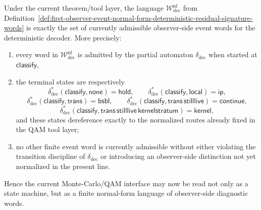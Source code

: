 \begin{proposition}
\label{prop:observer-event-normal-forms-exactly-currently-admissible-decoder-words}
Under the current theorem/tool layer, the language \(\mathcal W^{\mathrm{nf}}_{\mathrm{dec}}\) from Definition~\ref{def:first-observer-event-normal-form-deterministic-residual-signature-words} is exactly the set of currently admissible observer-side event words for the deterministic decoder. More precisely:
\begin{enumerate}[label=(\roman*)]
 \item every word in \(\mathcal W^{\mathrm{nf}}_{\mathrm{dec}}\) is admitted by the partial automaton \(\delta_{\mathrm{dec}}\) when started at \(\mathsf{classify}\),
 \item the terminal states are respectively
 \[
 \delta^{\ast}_{\mathrm{dec}}(\mathsf{classify},\mathsf{none})=\mathsf{hold},\qquad
 \delta^{\ast}_{\mathrm{dec}}(\mathsf{classify},\mathsf{local})=\mathsf{ip},
 \]
 \[
 \delta^{\ast}_{\mathrm{dec}}(\mathsf{classify},\mathsf{trans})=\mathsf{bsbl},\qquad
 \delta^{\ast}_{\mathrm{dec}}(\mathsf{classify},\mathsf{trans}\,\mathsf{stilllive})=\mathsf{continue},
 \]
 \[
 \delta^{\ast}_{\mathrm{dec}}(\mathsf{classify},\mathsf{trans}\,\mathsf{stilllive}\,\mathsf{kernelstratum})=\mathsf{kernel},
 \]
 and these states dereference exactly to the normalized routes already fixed in the QAM tool layer;
 \item no other finite event word is currently admissible without either violating the transition discipline of \(\delta_{\mathrm{dec}}\) or introducing an observer-side distinction not yet normalized in the present line.
\end{enumerate}
Hence the current Monte-Carlo/QAM interface may now be read not only as a state machine, but as a finite normal-form language of observer-side diagnostic words.
\end{proposition}

